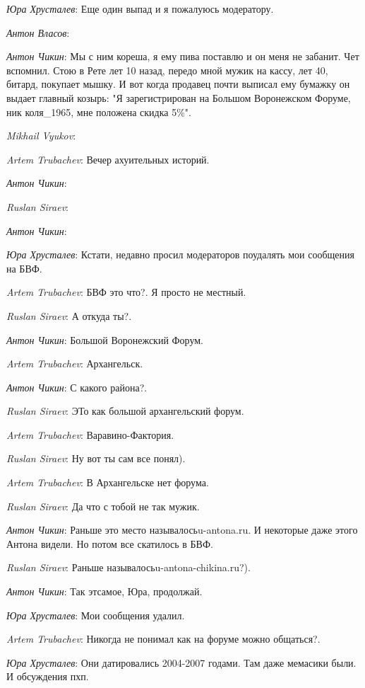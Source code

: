 \documentclass[10pt]{book}
\newcommand{\AUTHOR}[1]{\emph{#1}:}
\begin{document}
\AUTHOR{Юра Хрусталев} Еще один выпад и я пожалуюсь модератору.

\AUTHOR{Антон Власов}

\AUTHOR{Антон Чикин} Мы с ним кореша, я ему пива поставлю и он меня не забанит. Чет вспомнил. Стою в Рете лет 10 назад, передо мной мужик на кассу, лет 40, битард, покупает мышку. И вот когда продавец почти выписал ему бумажку он выдает главный козырь: "Я зарегистрирован на Большом Воронежском Форуме, ник коля_1965, мне положена скидка 5\%".

\AUTHOR{Mikhail Vyukov}

\AUTHOR{Artem Trubachev} Вечер ахуительных историй.

\AUTHOR{Антон Чикин}

\AUTHOR{Ruslan Siraev}

\AUTHOR{Антон Чикин}

\AUTHOR{Юра Хрусталев} Кстати, недавно просил модераторов поудалять мои сообщения на БВФ.

\AUTHOR{Artem Trubachev} БВФ это что?. Я просто не местный.

\AUTHOR{Ruslan Siraev} А откуда ты?.

\AUTHOR{Антон Чикин} Большой Воронежский Форум.

\AUTHOR{Artem Trubachev} Архангельск.

\AUTHOR{Антон Чикин} С какого района?.

\AUTHOR{Ruslan Siraev} ЭТо как большой архангельский форум.

\AUTHOR{Artem Trubachev} Варавино-Фактория.

\AUTHOR{Ruslan Siraev} Ну вот ты сам все понял).

\AUTHOR{Artem Trubachev} В Архангельске нет форума.

\AUTHOR{Ruslan Siraev} Да что с тобой не так мужик.

\AUTHOR{Антон Чикин} Раньше это место называлосьu-antona.ru. И некоторые даже этого Антона видели. Но потом все скатилось в БВФ.

\AUTHOR{Ruslan Siraev} Раньше называлосьu-antona-chikina.ru?).

\AUTHOR{Антон Чикин} Так этсамое, Юра, продолжай.

\AUTHOR{Юра Хрусталев} Мои сообщения удалил.

\AUTHOR{Artem Trubachev} Никогда не понимал как на форуме можно общаться?.

\AUTHOR{Юра Хрусталев} Они датировались 2004-2007 годами. Там даже мемасики были. И обсуждения пхп.
\end{document}
